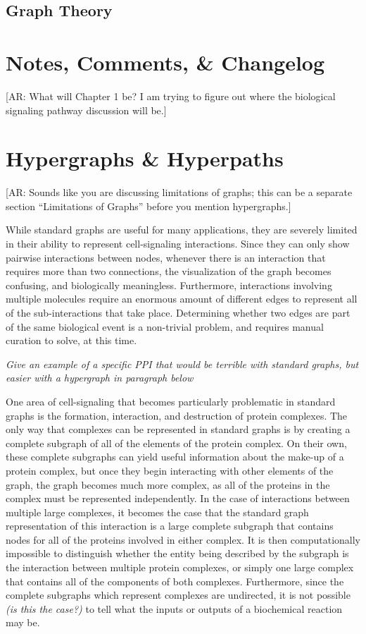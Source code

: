 \documentclass[12pt,twoside]{reedthesis}
\newcommand{\anna}[1]{{\color{blue}[AR: #1]}}
\begin{document}
\section{Graph Theory}

    \chapter{Notes, Comments, \& Changelog}
    
    \anna{What will Chapter 1 be? I am trying to figure out where the biological signaling pathway discussion will be.}
    	
    \chapter{Hypergraphs \& Hyperpaths}
    
    \anna{Sounds like you are discussing limitations of graphs; this can be a separate section ``Limitations of Graphs'' before you mention hypergraphs.}
    
While standard graphs are useful for many applications, they are severely limited in their ability to represent cell-signaling interactions.  Since they can only show pairwise interactions between nodes, whenever there is an interaction that requires more than two connections, the visualization of the graph becomes confusing, and biologically meaningless.  Furthermore, interactions involving multiple molecules require an enormous amount of different edges to represent all of the sub-interactions that take place.  Determining whether two edges are part of the same biological event is a non-trivial problem, and requires manual curation to solve, at this time.

\textit{Give an example of a specific PPI that would be terrible with standard graphs, but easier with a hypergraph in paragraph below}

One area of cell-signaling that becomes particularly problematic in standard graphs is the formation, interaction, and destruction of protein complexes.  The only way that complexes can be represented in standard graphs is by creating a complete subgraph of all of the elements of the protein complex.  On their own, these complete subgraphs can yield useful information about the make-up of a protein complex, but once they begin interacting with other elements of the graph, the graph becomes much more complex, as all of the proteins in the complex must be represented independently.  In the case of interactions between multiple large complexes, it becomes the case that the standard graph representation of this interaction is a large complete subgraph that contains nodes for all of the proteins involved in either complex.  It is then computationally impossible to distinguish whether the entity being described by the subgraph is the interaction between multiple protein complexes, or simply one large complex that contains all of the components of both complexes.  Furthermore, since the complete subgraphs which represent complexes are undirected, it is not possible \textit{(is this the case?)} to tell what the inputs or outputs of a biochemical reaction may be. 
\end{document}
